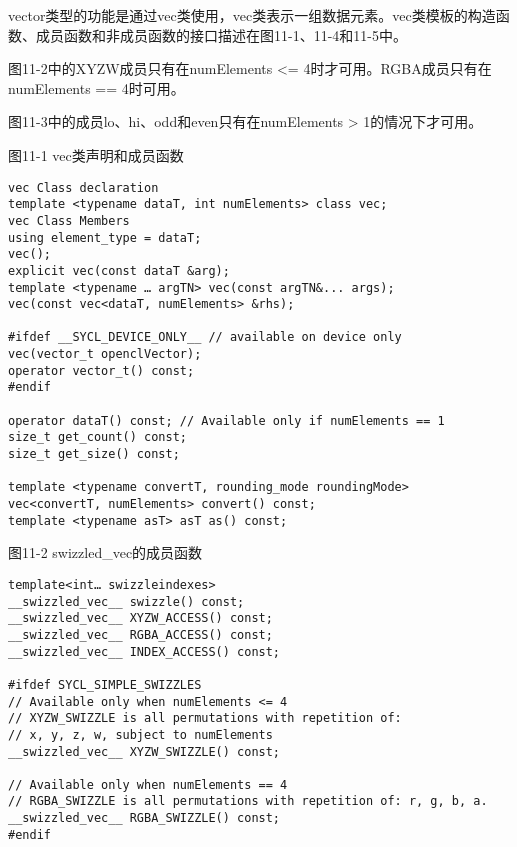 vector类型的功能是通过vec类使用，vec类表示一组数据元素。vec类模板的构造函数、成员函数和非成员函数的接口描述在图11-1、11-4和11-5中。\par

图11-2中的XYZW成员只有在numElements <= 4时才可用。RGBA成员只有在numElements == 4时可用。\par

图11-3中的成员lo、hi、odd和even只有在numElements > 1的情况下才可用。\par

\hspace*{\fill} \par %
图11-1 vec类声明和成员函数
\begin{lstlisting}[caption={}]
vec Class declaration
template <typename dataT, int numElements> class vec; 
vec Class Members 
using element_type = dataT; 
vec(); 
explicit vec(const dataT &arg); 
template <typename … argTN> vec(const argTN&... args); 
vec(const vec<dataT, numElements> &rhs); 

#ifdef __SYCL_DEVICE_ONLY__ // available on device only
vec(vector_t openclVector); 
operator vector_t() const; 
#endif

operator dataT() const; // Available only if numElements == 1 
size_t get_count() const; 
size_t get_size() const;

template <typename convertT, rounding_mode roundingMode> 
vec<convertT, numElements> convert() const; 
template <typename asT> asT as() const;
\end{lstlisting}

\hspace*{\fill} \par %
图11-2 swizzled\_vec的成员函数
\begin{lstlisting}[caption={}]
template<int… swizzleindexes>
__swizzled_vec__ swizzle() const; 
__swizzled_vec__ XYZW_ACCESS() const; 
__swizzled_vec__ RGBA_ACCESS() const; 
__swizzled_vec__ INDEX_ACCESS() const; 

#ifdef SYCL_SIMPLE_SWIZZLES
// Available only when numElements <= 4 
// XYZW_SWIZZLE is all permutations with repetition of: 
// x, y, z, w, subject to numElements
__swizzled_vec__ XYZW_SWIZZLE() const;

// Available only when numElements == 4 
// RGBA_SWIZZLE is all permutations with repetition of: r, g, b, a. 
__swizzled_vec__ RGBA_SWIZZLE() const; 
#endif
\end{lstlisting}

